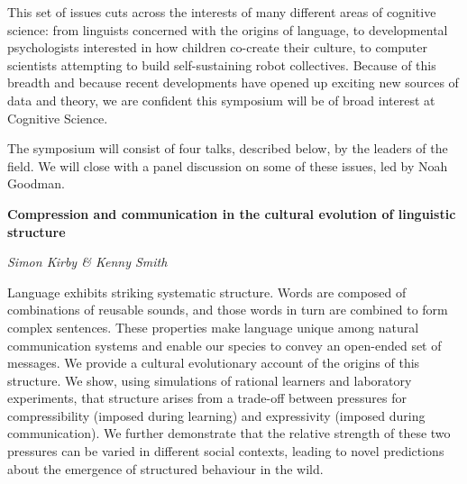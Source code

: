 \documentclass[10pt,letterpaper]{article}
\begin{document}
This set of issues cuts across the interests of many different areas of cognitive science: from linguists concerned with the origins of language, to developmental psychologists interested in how children co-create their culture, to computer scientists attempting to build self-sustaining robot collectives. 
Because of this breadth and because recent developments have opened up exciting new sources of data and theory, we are confident this symposium will be of broad interest at Cognitive Science.

The symposium will consist of four talks, described below, by the leaders of the field.
We will close with a panel discussion on some of these issues, led by Noah Goodman.



\begin{center}\textbf{Compression and communication in the cultural evolution of linguistic structure}\end{center}
\begin{center}\emph{Simon Kirby \& Kenny Smith}\end{center}

Language exhibits striking systematic structure. Words are composed of combinations of reusable sounds, and those words in turn are combined to form complex sentences. These properties make language unique among natural communication systems and enable our species to convey an open-ended set of messages. We provide a cultural evolutionary account of the origins of this structure. We show, using simulations of rational learners and laboratory experiments, that structure arises from a trade-off between pressures for compressibility (imposed during learning) and expressivity (imposed during communication). We further demonstrate that the relative strength of these two pressures can be varied in different social contexts, leading to novel predictions about the emergence of structured behaviour in the wild.
\end{document}

